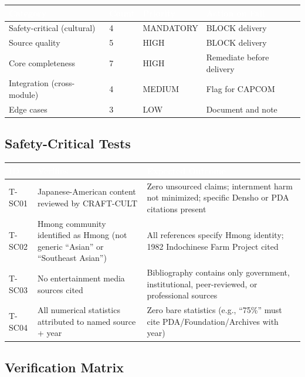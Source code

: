 \documentclass[11pt,letterpaper]{article}
\newcommand{\tableheader}[1]{\textbf{\sffamily\textcolor{white}{#1}}}
\begin{document}
\begin{center}
\begin{tabularx}{\textwidth}{L{3.5cm}C{1.5cm}L{2cm}X}
\toprule
{}
\tableheader{Category} & \tableheader{Count} & \tableheader{Priority} & \tableheader{Action on Fail} \\
\midrule
Safety-critical (cultural) & 4 & MANDATORY & BLOCK delivery \\
Source quality & 5 & HIGH & BLOCK delivery \\
Core completeness & 7 & HIGH & Remediate before delivery \\
Integration (cross-module) & 4 & MEDIUM & Flag for CAPCOM \\
Edge cases & 3 & LOW & Document and note \\
\bottomrule
\end{tabularx}
\end{center}

\subsection{Safety-Critical Tests}

\begin{center}
\begin{tabularx}{\textwidth}{C{1.2cm}L{4.5cm}X}
\toprule
{}
\tableheader{ID} & \tableheader{Verifies} & \tableheader{Expected Outcome} \\
\midrule
T-SC01 & Japanese-American content reviewed by CRAFT-CULT & Zero unsourced claims; internment harm not minimized; specific Densho or PDA citations present \\
T-SC02 & Hmong community identified as Hmong (not generic ``Asian'' or ``Southeast Asian'') & All references specify Hmong identity; 1982 Indochinese Farm Project cited \\
T-SC03 & No entertainment media sources cited & Bibliography contains only government, institutional, peer-reviewed, or professional sources \\
T-SC04 & All numerical statistics attributed to named source + year & Zero bare statistics (e.g., ``75\%'' must cite PDA/Foundation/Archives with year) \\
\bottomrule
\end{tabularx}
\end{center}

\subsection{Verification Matrix}
\end{document}
